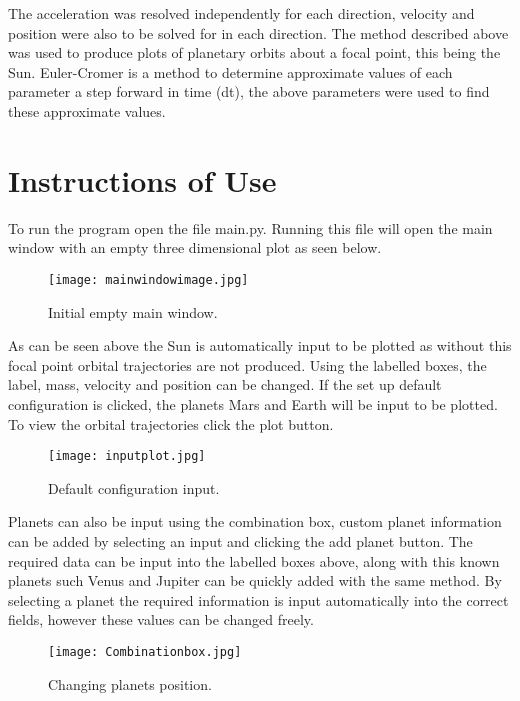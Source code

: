 \documentclass[11pt]{article}
\begin{document}
The acceleration was resolved independently for each direction, velocity and position were also to be solved for in each direction. The method described above was used to produce plots of planetary orbits about a focal point, this being the Sun. Euler-Cromer is a method to determine approximate values of each parameter a step forward in time (dt), the above parameters were used to find these approximate values.
\section{Instructions of Use\label{sec:IOU}}
To run the program open the file main.py. Running this file will open the main window with an empty three dimensional plot as seen below.

\begin{figure}[htbp] 										 
   \centering											
   \texttt{[image: mainwindowimage.jpg]} 				
   \caption{Initial empty main window.}	
   \label{fig:inemaw}								 
\end{figure}

As can be seen above the Sun is automatically input to be plotted as without this focal point orbital trajectories are not produced. Using the labelled boxes, the label, mass, velocity and position can be changed. If the set up default configuration is clicked, the planets Mars and Earth will be input to be  plotted. To view the orbital trajectories click the plot button. 

\begin{figure}[htbp] 										 
   \centering											
   \texttt{[image: inputplot.jpg]} 				
   \caption{Default configuration input.}	
   \label{fig:Defconin}								 
\end{figure}

Planets can also be input using the combination box, custom planet information can be added by selecting an input and clicking the add planet button. The required data can be input into the labelled boxes above, along with this known planets such Venus and Jupiter can be quickly added with the same method. By selecting a planet the required information is input automatically into the correct fields, however these values can be changed freely.

\begin{figure}[htbp] 										 
   \centering											
   \texttt{[image: Combinationbox.jpg]} 				
   \caption{Changing planets position.}	
   \label{fig:chplpo}								 
\end{figure}
\end{document}

